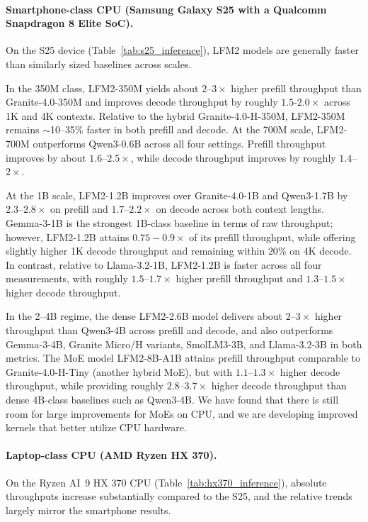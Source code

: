\documentclass{article}
\begin{document}
\paragraph{Smartphone-class CPU (Samsung Galaxy S25 with a Qualcomm Snapdragon 8 Elite SoC).}
On the S25 device (Table~\ref{tab:s25_inference}), LFM2 models are generally faster than similarly sized baselines across scales. 

In the 350M class, LFM2-350M yields about $2$--$3\times$ higher prefill throughput than Granite-4.0-350M and improves decode throughput by roughly $1.5$-$2.0\times$ across 1K and 4K contexts. Relative to the hybrid Granite-4.0-H-350M, LFM2-350M remains $\sim$10--35\% faster in both prefill and decode. At the 700M scale, LFM2-700M outperforms Qwen3-0.6B across all four settings. Prefill throughput improves by about $1.6$--$2.5\times$, while decode throughput improves by roughly $1.4$--$2\times$.

At the 1B scale, LFM2-1.2B improves over Granite-4.0-1B and Qwen3-1.7B by $2.3$--$2.8\times$ on prefill and $1.7$--$2.2\times$ on decode across both context lengths. Gemma-3-1B is the strongest 1B-class baseline in terms of raw throughput; however, LFM2-1.2B attains $0.75-0.9\times$ of its prefill throughput, while offering slightly higher 1K decode throughput and remaining within $20\%$ on 4K decode. In contrast, relative to Llama-3.2-1B, LFM2-1.2B is faster across all four measurements, with roughly $1.5$--$1.7\times$ higher prefill throughput and $1.3$--$1.5\times$ higher decode throughput.

In the 2--4B regime, the dense LFM2-2.6B model delivers about $2$--$3\times$ higher throughput than Qwen3-4B across prefill and decode, and also outperforms Gemma-3-4B, Granite Micro/H variants, SmolLM3-3B, and Llama-3.2-3B in both metrics. The MoE model LFM2-8B-A1B attains prefill throughput comparable to Granite-4.0-H-Tiny (another hybrid MoE), but with $1.1$--$1.3\times$ higher decode throughput, while providing roughly $2.8$--$3.7\times$ higher decode throughput than dense 4B-class baselines such as Qwen3-4B. We have found that there is still room for large improvements for MoEs on CPU, and we are developing improved kernels that better utilize CPU hardware. 


\paragraph{Laptop-class CPU (AMD Ryzen HX 370).}
On the Ryzen AI~9 HX 370 CPU (Table~\ref{tab:hx370_inference}), absolute throughputs increase substantially compared to the S25, and the relative trends largely mirror the smartphone results.
\end{document}
